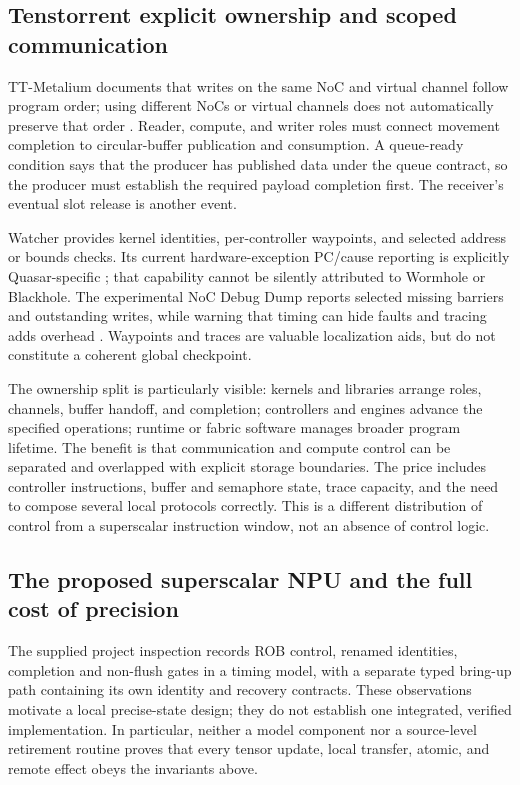 \subsection{Tenstorrent explicit ownership and scoped communication}

TT-Metalium documents that writes on the same NoC and virtual channel follow program order; using different NoCs or virtual channels does not automatically preserve that order \citep{u007_tt_ordering}. Reader, compute, and writer roles must connect movement completion to circular-buffer publication and consumption. A queue-ready condition says that the producer has published data under the queue contract, so the producer must establish the required payload completion first. The receiver's eventual slot release is another event.

Watcher provides kernel identities, per-controller waypoints, and selected address or bounds checks. Its current hardware-exception PC/cause reporting is explicitly Quasar-specific \citep{u007_tt_watcher}; that capability cannot be silently attributed to Wormhole or Blackhole. The experimental NoC Debug Dump reports selected missing barriers and outstanding writes, while warning that timing can hide faults and tracing adds overhead \citep{u007_tt_noc_debug}. Waypoints and traces are valuable localization aids, but do not constitute a coherent global checkpoint.

The ownership split is particularly visible: kernels and libraries arrange roles, channels, buffer handoff, and completion; controllers and engines advance the specified operations; runtime or fabric software manages broader program lifetime. The benefit is that communication and compute control can be separated and overlapped with explicit storage boundaries. The price includes controller instructions, buffer and semaphore state, trace capacity, and the need to compose several local protocols correctly. This is a different distribution of control from a superscalar instruction window, not an absence of control logic.

\subsection{The proposed superscalar NPU and the full cost of precision}

The supplied project inspection records ROB control, renamed identities, completion and non-flush gates in a timing model, with a separate typed bring-up path containing its own identity and recovery contracts. These observations motivate a local precise-state design; they do not establish one integrated, verified implementation. In particular, neither a model component nor a source-level retirement routine proves that every tensor update, local transfer, atomic, and remote effect obeys the invariants above.

